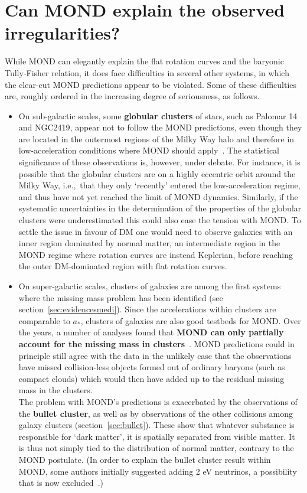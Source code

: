 \section{Can MOND explain the observed irregularities?}
\label{sec:MONDproblems}
While MOND can elegantly explain the flat rotation curves and the baryonic Tully-Fisher relation, it does face difficulties in several other systems, in which the clear-cut MOND predictions appear to be violated. Some of these difficulties are, 
roughly ordered in the increasing degree of seriousness, as follows.\label{MONDproblems} 
\begin{itemize}
\item[i)] 

On sub-galactic scales, 
some {\bf globular clusters} of stars, such as Palomar 14 and NGC2419, appear not to follow the MOND predictions, even though they are located in the outermost regions of the Milky Way halo and therefore in low-acceleration conditions where MOND should apply~\cite{MONDfailuresandsuccesses}. 
The statistical significance of these observations is, however, under debate. 
For instance, it is possible that the globular clusters are on a highly eccentric orbit around the Milky Way, i.e.,~that they only `recently' entered the low-acceleration regime, and thus have not yet reached the limit of MOND dynamics.
Similarly, if the systematic uncertainties in the determination of the properties of the globular clusters were underestimated this could also ease the tension with MOND.
To settle the issue in favour of DM one would need to observe galaxies with an inner region dominated by normal matter,
an intermediate region in the MOND regime where rotation curves are instead Keplerian,
before reaching the outer DM-dominated region with flat rotation curves.

\item[ii)]
On super-galactic scales,
clusters of galaxies are among the first systems where the missing mass problem has been identified (see section~\ref{sec:evidencesmedi}).  
Since the accelerations within clusters are comparable to $a_*$, clusters of galaxies are also good testbeds for MOND. 
Over the years, a number of analyses found that {\bf MOND can only partially account for the missing mass in clusters}~\cite{MONDfailuresandsuccesses}. 
MOND predictions could in principle still agree with the data in the unlikely case that the observations have missed collision-less objects formed out of ordinary baryons 
(such as compact clouds) which would then have added up to the residual missing mass in the clusters. \\
The problem with MOND's predictions is exacerbated by the observations of the {\bf bullet cluster}, as well as by observations of the other collisions among galaxy clusters (section~\ref{sec:bullet}). These show that whatever substance is responsible for `dark matter', it
is spatially separated from visible matter. It is thus not simply tied to the distribution of normal matter, contrary to the MOND postulate. 
(In order to explain the bullet cluster result within MOND, some authors initially suggested adding 2 eV neutrinos, a possibility that is now excluded~\cite{MONDfailuresandsuccesses}.)





\end{itemize}
